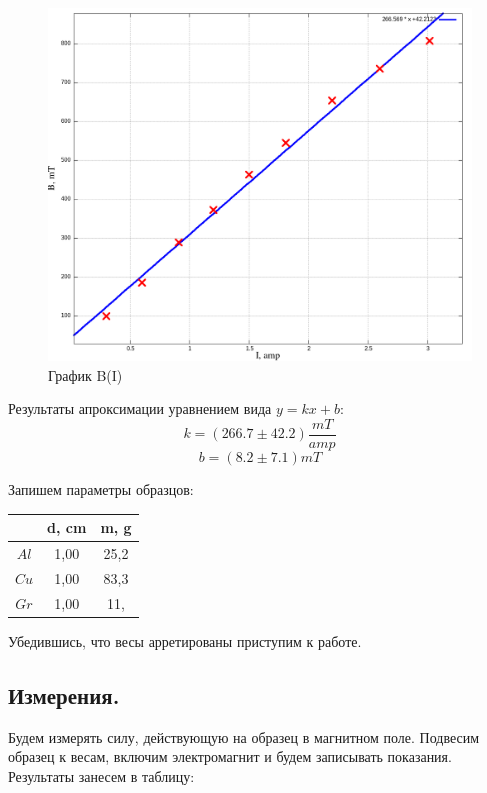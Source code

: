 \documentclass{article}
\begin{document}
    \begin{figure}[H]
        \centering
        \includegraphics[width=\textwidth]{BI-comp.png}
        \caption{График B(I)}
    \end{figure}

    Результаты апроксимации уравнением вида \(y = kx + b\):
    \[ k = (266.7 \pm 42.2) \frac{mT}{amp} \]
    \[ b = (8.2 \pm 7.1) mT \]


    Запишем параметры образцов:

    \begin {table}[H]
        \centering
    \begin{tabular}{|c|c|c|}
        \hline
                & d, cm & m, g  \\\hline
        \(Al\)  & 1,00  & 25,2  \\\hline
        \(Cu\)  & 1,00  & 83,3  \\\hline
        \(Gr\)  & 1,00  & 11,   \\\hline
        
        
    \end{tabular}
    \end{table}


    Убедившись, что весы арретированы приступим к работе.

    \subsection{Измерения.}
    Будем измерять силу, действующую на образец в магнитном поле. Подвесим образец к весам,
    включим электромагнит и будем записывать показания. Результаты занесем в таблицу:
\end{document}
